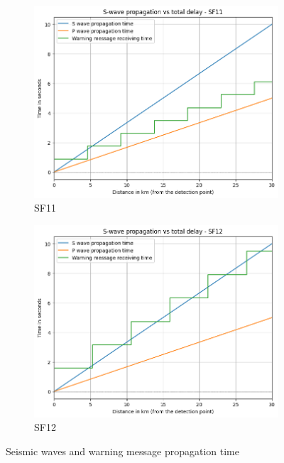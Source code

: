 \begin{figure}[htp!]
\begin{subfigure}{0.45\linewidth}
        \includegraphics[width=\linewidth]{images/sf-11-30km.png}
        \caption{SF11}
    \end{subfigure}
    \hfill
    \begin{subfigure}{0.45\linewidth}
        \includegraphics[width=\linewidth]{images/sf-12-30km.png}
        \caption{SF12}
    \end{subfigure}
    \caption{Seismic waves and warning message propagation time}
    \label{fig:seismic_vs_warning_message_collage}
\end{figure}

\newpage

